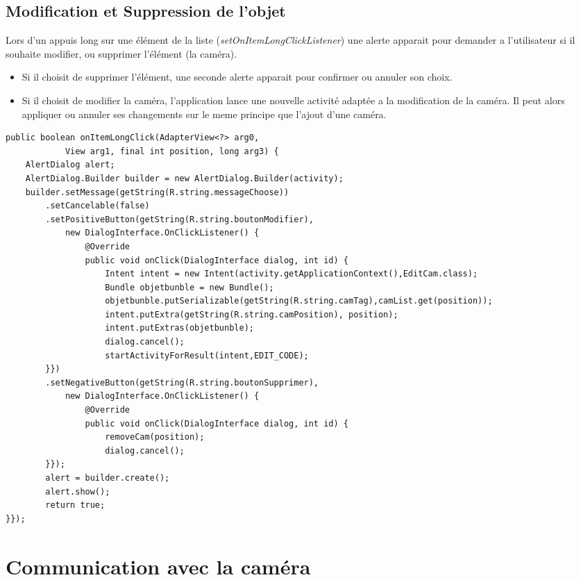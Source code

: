 \subsection{Modification et Suppression de l'objet}
Lors d'un appuis long sur une élément de la liste
(\textit{setOnItemLongClickListener}) une alerte apparait pour demander a
l'utilisateur si il souhaite modifier, ou supprimer l'élément (la caméra).
\begin{itemize}
  \item Si il choisit de supprimer l'élément, une seconde alerte apparait pour confirmer
ou annuler son choix. 
\item Si il choisit de modifier la caméra, l'application lance une nouvelle
activité adaptée a la modification de la caméra. Il peut alors appliquer ou
annuler ses changements sur le meme principe que l'ajout d'une caméra.
\end{itemize}
\newpage
\begin{changemargin}{-2cm}{-2cm}
\begin{lstlisting}[caption={Gestion d'un appui long sur un élément de la
liste.}]
public boolean onItemLongClick(AdapterView<?> arg0, 
			View arg1, final int position, long arg3) { 
	AlertDialog alert; 
	AlertDialog.Builder builder = new AlertDialog.Builder(activity);
	builder.setMessage(getString(R.string.messageChoose))
		.setCancelable(false)
		.setPositiveButton(getString(R.string.boutonModifier),
			new DialogInterface.OnClickListener() {
				@Override
				public void onClick(DialogInterface dialog, int id) {
					Intent intent = new Intent(activity.getApplicationContext(),EditCam.class); 
					Bundle objetbunble = new Bundle();
					objetbunble.putSerializable(getString(R.string.camTag),camList.get(position));
					intent.putExtra(getString(R.string.camPosition), position);
					intent.putExtras(objetbunble);
					dialog.cancel();
					startActivityForResult(intent,EDIT_CODE);
		}})
		.setNegativeButton(getString(R.string.boutonSupprimer),
			new DialogInterface.OnClickListener() {
				@Override
				public void onClick(DialogInterface dialog, int id) {
					removeCam(position);
					dialog.cancel();
		}});
		alert = builder.create();
		alert.show();
		return true;
}});
\end{lstlisting}
\end{changemargin}


\section{Communication avec la caméra}


